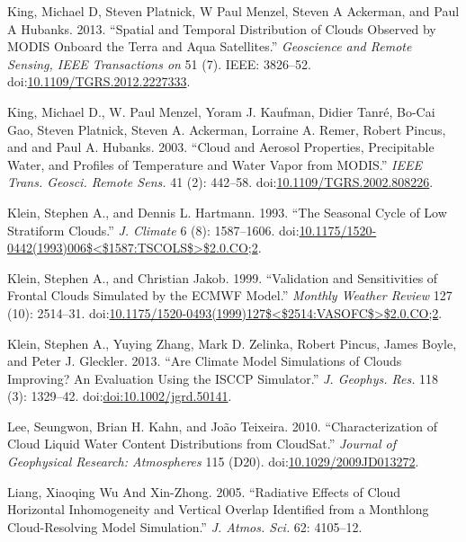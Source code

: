 \hypertarget{ref-kingux5fetux5falux5f2013}{}
King, Michael D, Steven Platnick, W Paul Menzel, Steven A Ackerman, and
Paul A Hubanks. 2013. ``Spatial and Temporal Distribution of Clouds
Observed by MODIS Onboard the Terra and Aqua Satellites.''
\emph{Geoscience and Remote Sensing, IEEE Transactions on} 51 (7). IEEE:
3826--52.
doi:\href{https://doi.org/10.1109/TGRS.2012.2227333}{10.1109/TGRS.2012.2227333}.

\hypertarget{ref-kingux5fetux5falux5f2003}{}
King, Michael D., W. Paul Menzel, Yoram J. Kaufman, Didier Tanré, Bo-Cai
Gao, Steven Platnick, Steven A. Ackerman, Lorraine A. Remer, Robert
Pincus, and and Paul A. Hubanks. 2003. ``Cloud and Aerosol Properties,
Precipitable Water, and Profiles of Temperature and Water Vapor from
MODIS.'' \emph{IEEE Trans. Geosci. Remote Sens.} 41 (2): 442--58.
doi:\href{https://doi.org/10.1109/TGRS.2002.808226}{10.1109/TGRS.2002.808226}.

\hypertarget{ref-kleinux5fandux5fhartmannux5f1993}{}
Klein, Stephen A., and Dennis L. Hartmann. 1993. ``The Seasonal Cycle of
Low Stratiform Clouds.'' \emph{J. Climate} 6 (8): 1587--1606.
doi:\href{https://doi.org/10.1175/1520-0442(1993)006$\%3C$1587:TSCOLS$\%3E$2.0.CO;2}{10.1175/1520-0442(1993)006\$\textless{}\$1587:TSCOLS\$\textgreater{}\$2.0.CO;2}.

\hypertarget{ref-kleinux5fandux5fjakobux5f1999}{}
Klein, Stephen A., and Christian Jakob. 1999. ``Validation and
Sensitivities of Frontal Clouds Simulated by the ECMWF Model.''
\emph{Monthly Weather Review} 127 (10): 2514--31.
doi:\href{https://doi.org/10.1175/1520-0493(1999)127$\%3C$2514:VASOFC$\%3E$2.0.CO;2}{10.1175/1520-0493(1999)127\$\textless{}\$2514:VASOFC\$\textgreater{}\$2.0.CO;2}.

\hypertarget{ref-kleinux5fetux5falux5f2013}{}
Klein, Stephen A., Yuying Zhang, Mark D. Zelinka, Robert Pincus, James
Boyle, and Peter J. Gleckler. 2013. ``Are Climate Model Simulations of
Clouds Improving? An Evaluation Using the ISCCP Simulator.'' \emph{J.
Geophys. Res.} 118 (3): 1329--42.
doi:\href{https://doi.org/doi:10.1002/jgrd.50141}{doi:10.1002/jgrd.50141}.

\hypertarget{ref-leeux5fetux5falux5f2010}{}
Lee, Seungwon, Brian H. Kahn, and João Teixeira. 2010.
``Characterization of Cloud Liquid Water Content Distributions from
CloudSat.'' \emph{Journal of Geophysical Research: Atmospheres} 115
(D20).
doi:\href{https://doi.org/10.1029/2009JD013272}{10.1029/2009JD013272}.

\hypertarget{ref-wuux5fandux5fliangux5f2005}{}
Liang, Xiaoqing Wu And Xin-Zhong. 2005. ``Radiative Effects of Cloud
Horizontal Inhomogeneity and Vertical Overlap Identified from a
Monthlong Cloud-Resolving Model Simulation.'' \emph{J. Atmos. Sci.} 62:
4105--12.

